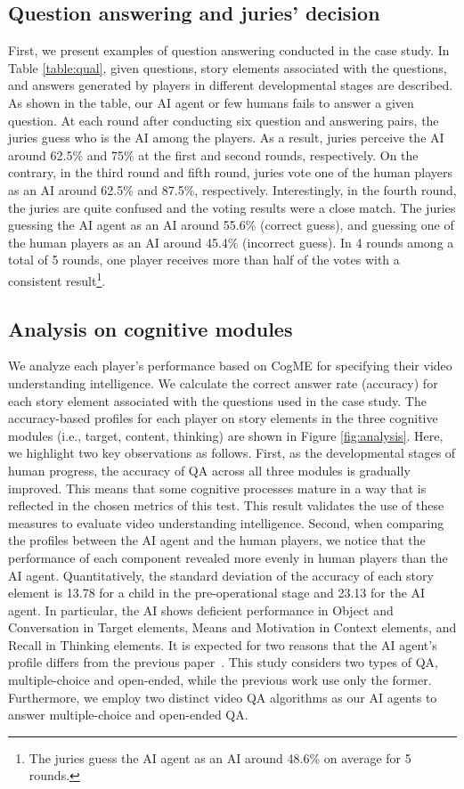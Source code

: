 \documentclass[letterpaper]{article} %
\begin{document}
\subsection{Question answering and juries' decision} 
First, we present examples of question answering conducted in the case study. In Table \ref{table:qual}, given questions, story elements associated with the questions, and answers generated by players in different developmental stages are described. As shown in the table, our AI agent or few humans fails to answer a given question. At each round after conducting six question and answering pairs, the juries guess who is the AI among the players. As a result, juries perceive the AI around 62.5\% and 75\% at the first and second rounds, respectively. On the contrary, in the third round and fifth round, juries vote one of the human players as an AI around 62.5\% and 87.5\%, respectively. Interestingly, in the fourth round, the juries are quite confused and the voting results were a close match. The juries guessing the AI agent as an AI around 55.6\% (correct guess), and guessing one of the human players as an AI around 45.4\% (incorrect guess). In 4 rounds among a total of 5 rounds, one player receives more than half of the votes with a consistent result\footnote{The juries guess the AI agent as an AI around 48.6\% on average for 5 rounds.}.

\subsection{Analysis on cognitive modules}
We analyze each player's performance based on CogME for specifying their video understanding intelligence. We calculate the correct answer rate (accuracy) for each story element associated with the questions used in the case study. The accuracy-based profiles for each player on story elements in the three cognitive modules (i.e., target, content, thinking) are shown in Figure \ref{fig:analysis}. Here, we highlight two key observations as follows. First, as the developmental stages of human progress, the accuracy of QA across all three modules is gradually improved. This means that some cognitive processes mature in a way that is reflected in the chosen metrics of this test. This result validates the use of these measures to evaluate video understanding intelligence.
Second, when comparing the profiles between the AI agent and the human players, we notice that the performance of each component revealed more evenly in human players than the AI agent. Quantitatively, the standard deviation of the accuracy of each story element is 13.78 for a child in the pre-operational stage and 23.13 for the AI agent. In particular, the AI shows deficient performance in Object and Conversation in Target elements, Means and Motivation in Context elements, and Recall in Thinking elements. It is expected for two reasons that the AI agent's profile differs from the previous paper~\cite{shin2021cogme}. This study considers two types of QA, multiple-choice and open-ended, while the previous work use only the former. Furthermore, we employ two distinct video QA algorithms as our AI agents to answer multiple-choice and open-ended QA.
\end{document}
